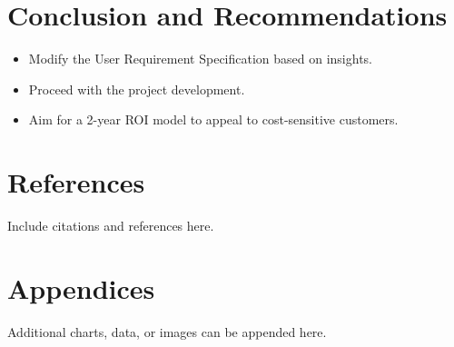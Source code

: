 \documentclass[12pt]{article}
\begin{document}
\newpage



\section{Conclusion and Recommendations}
\begin{itemize}
    \item Modify the User Requirement Specification based on insights.
    \item Proceed with the project development.
    \item Aim for a 2-year ROI model to appeal to cost-sensitive customers.
\end{itemize}

\section{References}
Include citations and references here.

\section{Appendices}
Additional charts, data, or images can be appended here.
\end{document}
